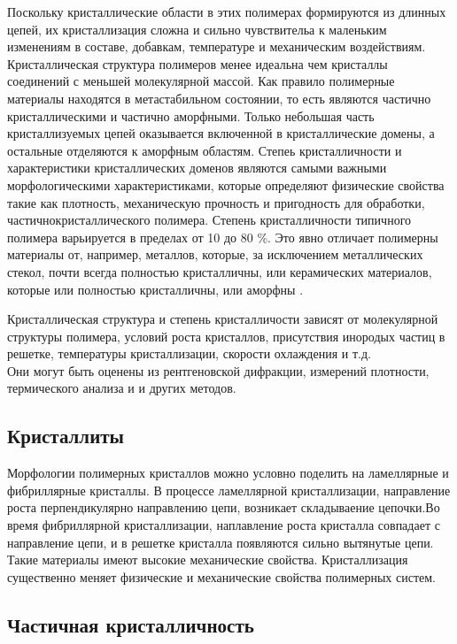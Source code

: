 Поскольку кристаллические области в этих полимерах формируются из длинных цепей, их кристаллизация сложна и сильно чувствительа к маленьким изменениям в составе, добавкам, температуре и механическим воздействиям.\\
Кристаллическая структура полимеров менее идеальна чем кристаллы соединений с меньшей молекулярной массой. Как правило полимерные материалы находятся в метастабильном состоянии, то есть являются частично кристаллическими и частично аморфными. Только небольшая часть кристаллизуемых цепей оказывается включенной в кристаллические домены, а остальные отделяются к аморфным областям. Степеь кристалличности и характеристики кристаллических доменов являются самыми важными морфологическими характеристиками, которые определяют физические свойства такие как плотность, механическую прочность и  пригодность для обработки,  частичнокристаллического полимера.
Степень кристалличности типичного полимера варьируется в пределах от 10 до 80 \%. Это явно отличает  полимерны материалы от, например, металлов, которые, за исключением металлических стекол, почти всегда полностью кристалличны, или керамических материалов, которые или полностью кристалличны, или аморфны \cite{cryst1}.

Кристаллическая структура и степень кристалличости зависят от молекулярной структуры полимера, условий роста кристаллов, присутствия инородых частиц в решетке, температуры кристаллизации, скорости охлаждения и т.д.\\
Они могут быть оценены из рентгеновской дифракции, измерений плотности, термического анализа и и других методов.

\subsection{Кристаллиты}
Морфологии полимерных кристаллов можно условно поделить на ламеллярные и фибриллярные кристаллы. В процессе ламеллярной кристаллизации, направление роста перпендикулярно направлению цепи, возникает складываение цепочки.Во время фибриллярной кристаллизации, наплавление роста кристалла совпадает с направление цепи, и в решетке кристалла появляются сильно вытянутые  цепи. Такие материалы имеют высокие механические свойства. Кристаллизация существенно меняет физические и механические свойства полимерных систем. \\


\subsection{Частичная кристалличность}

